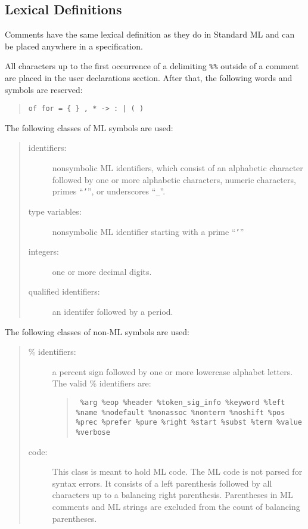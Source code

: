 \subsection{Lexical Definitions}

Comments have the same lexical definition as they do in Standard
ML and can be placed anywhere in a specification.

All characters up to the first occurrence of a delimiting
{\tt  \%\%} outside of
a comment are placed in the user declarations section.  After that, the
following words and symbols are reserved:
\begin{quote}

\verb'of for = { } , * -> : | ( )'

\end{quote}
        
The following classes of ML symbols are used:
\begin{quote}
\begin{description}
\item[identifiers:]
                nonsymbolic ML identifiers, which consist
                of an alphabetic character followed by one or
                more alphabetic characters, numeric characters,
                primes ``{\tt '}'', or underscores ``{\tt \_}''.
\item[type variables:]
                nonsymbolic ML identifier starting with a prime ``{\tt '}''
\item[integers:] one or more decimal digits.
\item[qualified identifiers:] an identifer followed by a period.

\end{description}
\end{quote}
The following classes of non-ML symbols are used:
\begin{quote}
\begin{description}
\item[\% identifiers:]
                a percent sign followed by one or more lowercase
                alphabet letters.  The valid \% identifiers
                are:
\begin{quote}
\raggedright
\tt
                \%arg \%eop \%header \%token\_sig\_info \%keyword
		\%left \%name \%nodefault
                \%nonassoc \%nonterm \%noshift \%pos \%prec \%prefer
                \%pure \%right \%start \%subst \%term \%value \%verbose
\end{quote}
\item[code:]
                This class is meant to hold ML code.  The ML code is not
                parsed for syntax errors.  It consists of a left parenthesis
                followed by all characters up to a balancing right
                parenthesis.  Parentheses in ML comments and ML strings
                are excluded from the count of balancing parentheses.

\end{description}
\end{quote}

